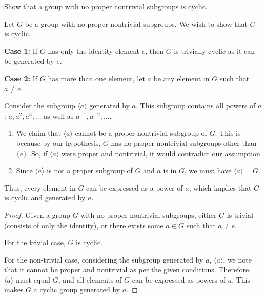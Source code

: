 \documentclass[12pt]{amsart}
\theoremstyle{definition}
\numberwithin{equation}{section}
\theoremstyle{plain}
\begin{document}
    \begin{exercise}{57} Show that a group with no proper nontrivial subgroups is cyclic.

        
        Let \( G \) be a group with no proper nontrivial subgroups. We wish to show that \( G \) is cyclic.

        \textbf{Case 1:} If \( G \) has only the identity element \( e \), then \( G \) is trivially cyclic as it can be generated by \( e \).
        
        \textbf{Case 2:} If \( G \) has more than one element, let \( a \) be any element in \( G \) such that \( a \neq e \).
        
        Consider the subgroup \( \langle a \rangle \) generated by \( a \). This subgroup contains all powers of \( a \): \( a, a^2, a^3, \ldots \) as well as \( a^{-1}, a^{-2}, \ldots \).
        
        \begin{enumerate}
            \item We claim that \( \langle a \rangle \) cannot be a proper nontrivial subgroup of \( G \). This is because by our hypothesis, \( G \) has no proper nontrivial subgroups other than \( \{ e \} \). So, if \( \langle a \rangle \) were proper and nontrivial, it would contradict our assumption.
            \item Since \( \langle a \rangle \) is not a proper subgroup of \( G \) and \( a \) is in \( G \), we must have \( \langle a \rangle = G \).
            
        \end{enumerate}
        Thus, every element in \( G \) can be expressed as a power of \( a \), which implies that \( G \) is cyclic and generated by \( a \).
        
        \begin{proof}
        Given a group \( G \) with no proper nontrivial subgroups, either \( G \) is trivial (consists of only the identity), or there exists some \( a \in G \) such that \( a \neq e \). 
        
        For the trivial case, \( G \) is cyclic.
        
        For the non-trivial case, considering the subgroup generated by \( a \), \( \langle a \rangle \), we note that it cannot be proper and nontrivial as per the given conditions. Therefore, \( \langle a \rangle \) must equal \( G \), and all elements of \( G \) can be expressed as powers of \( a \). This makes \( G \) a cyclic group generated by \( a \).
        \end{proof}
    \end{exercise}
\end{document}
